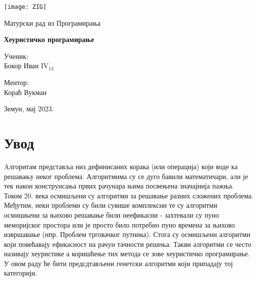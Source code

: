 \documentclass{article}
\begin{document}

\thispagestyle{empty}

\graphicspath{{./images/}}

\begin{center}
    \texttt{[image: ZIG]}
\end{center}

\vspace*{20mm}

\begin{center}
    \LARGE Матурски рад из Програмирања

    \vspace*{8pt}

    \Huge \textbf{Хеуристичко програмирање}
\end{center}

\vspace*{40mm}

\setlength{\columnsep}{50pt}
\begin{multicols}{2}
 {\noindent \Large Ученик:
\\ Бокор Иван IV$_{12}$}

 {\noindent \hfill \Large \centering{}Ментор: \\
 \hfill \phantom{111} Кораћ Вукман}

\end{multicols}

\vfill

\begin{center}
    \Large Земун, мај 2023.
\end{center}

\newpage


\tableofcontents


\newpage
{}

\section{Увод}

Aлгоритам представља низ дефинисаних корака (или операција) који воде ка
решавању неког проблема. Алгоритмима су се дуго бавили математичари, али је 
тек након конструисања првих рачунара њима посвењена значајнија пажња. Током 
20. века осмишљени су алгоритми за решавање разних сложених проблема.  Међутим,
неки проблеми су били сувише комплексни те су алгоритми осмишњени за њихово
решавање били неефикасни - захтевали су пуно меморијског простора или је просто 
било потребно пуно времена за њихово извршавање (нпр. Проблем трговачког путника).
Стога су осмишљени алгоритми који повећавају ефикасност на рачун тачности решења.
Такви алгоритми се често називају хеуристике а коришћење тих метода се зове хеуристичко програмирање.
У овом раду ће бити предсдтављени генетски алгоритми који припадају тој категорији.
\end{document}

